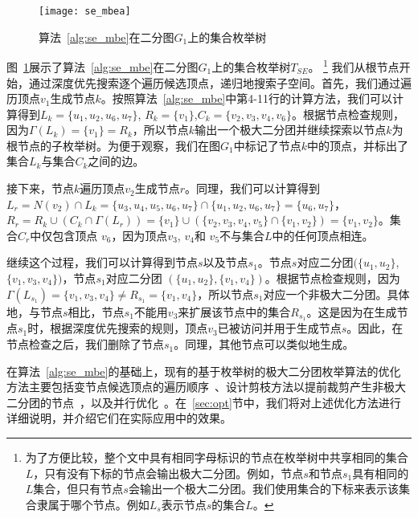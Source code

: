 \begin{figure} [ht]
  \vspace{0.1 in}
  \centering
  \texttt{[image: se\_mbea]}
  \vspace{0.05 in}
  \caption{算法~\ref{alg:se_mbe}在二分图$G_1$上的集合枚举树}
  \label{fig:se_mbea}
\end{figure}

\begin{example}
  \label{example:se}
  图~\ref{fig:se_mbea}展示了算法~\ref{alg:se_mbe}在二分图$G_1$上的集合枚举树$T_{SE}$。
  \footnote{为了方便比较，整个文中具有相同字母标识的节点在枚举树中共享相同的集合$L$，只有没有下标的节点会输出极大二分团。例如，节点$s$和节点$s_1$具有相同的$L$集合，但只有节点$s$会输出一个极大二分团。我们使用集合的下标来表示该集合隶属于哪个节点。例如$L_s$表示节点$s$的集合$L$。 
}
我们从根节点开始，通过深度优先搜索逐个遍历候选顶点，递归地搜索子空间。首先，我们通过遍历顶点$v_1$生成节点$k$。按照算法~\ref{alg:se_mbe}中第4-11行的计算方法，我们可以计算得到$L_k=\{u_1, u_2, u_6, u_7\}$, $R_k=\{v_1\}$,$C_k=\{v_2,v_3,v_4,v_6\}$。根据节点检查规则，因为$\Gamma(L_{k}) = \{v_1\} = R_{k}$，所以节点$k$输出一个极大二分团并继续探索以节点$k$为根节点的子枚举树。为便于观察，我们在图$G_1$中标记了节点$k$中的顶点，并标出了集合$L_k$与集合$C_k$之间的边。

接下来，节点$k$遍历顶点$v_2$生成节点$r$。同理，我们可以计算得到$L_{r} = N(v_2) \cap L_{k} 
= \{u_3, u_4, u_5, u_6, u_7\} \cap \{u_1, u_2, u_6, u_7\} = \{u_6, u_7\}$， $R_{r} = R_{k} \cup (C_{k} \cap \Gamma(L_{r})) = \{v_1\} \cup (\{v_2, v_3, v_4, v_5\} \cap \{v_1, v_2\}) = \{v_1, v_2\}$。集合$C_{r}$中仅包含顶点 $v_6$，因为顶点$v_3$, $v_4$和 $v_5$不与集合$L$中的任何顶点相连。

继续这个过程，我们可以计算得到节点$s$以及节点$s_1$。节点$s$对应二分团$(\{u_1, u_2\}$, $\{v_1, v_3, v_4\})$，节点$s_1$对应二分团 $(\{u_1, u_2\}, \{v_1, v_4\})$。根据节点检查规则，因为$\Gamma(L_{s_1}) = \{v_1, v_3, v_4\} \neq R_{s_1} = \{v_1, v_4\}$，所以节点$s_1$对应一个非极大二分团。具体地，与节点$s$相比，节点$s_1$不能用$v_3$来扩展该节点中的集合$R_{s_1}$。这是因为在生成节点$s_1$时，根据深度优先搜索的规则，顶点$v_3$已被访问并用于生成节点$s$。因此，在节点检查之后，我们删除了节点$s_1$。同理，其他节点可以类似地生成。

\end{example}

在算法~\ref{alg:se_mbe}的基础上，现有的基于枚举树的极大二分团枚举算法的优化方法主要包括变节点候选顶点的遍历顺序~\cite{minel06,iMBEA14,PMBE20,ooMBE22}、设计剪枝方法以提前裁剪产生非极大二分团的节点~\cite{iMBEA14,PMBE20,ooMBE22}，以及并行优化~\cite{mapreduceMBE16,parMBE18}。在~\ref{sec:opt}节中，我们将对上述优化方法进行详细说明，并介绍它们在实际应用中的效果。

